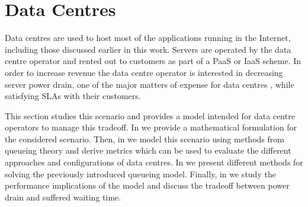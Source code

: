\section{Data Centres}\label{sec:cloud:data_centers}
Data centres are used to host most of the applications running in the Internet, including those discussed earlier in this work.
Servers are operated by the data centre operator and rented out to customers as part of a \gls{PaaS} or \gls{IaaS} scheme.
In order to increase revenue the data centre operator is interested in decreasing server power drain, one of the major matters of expense for data centres \cite{Greenberg2009b}, while satisfying \glspl{SLA} with their customers.

This section studies this scenario and provides a model intended for data centre operators to manage this tradeoff.
In  we provide a mathematical formulation for the considered scenario.
Then, in  we model this scenario using methods from queueing theory and derive metrics which can be used to evaluate the different approaches and configurations of data centres.
In  we present different methods for solving the previously introduced queueing model.
Finally, in  we study the performance implications of the model and discuss the tradeoff between power drain and suffered waiting time.




